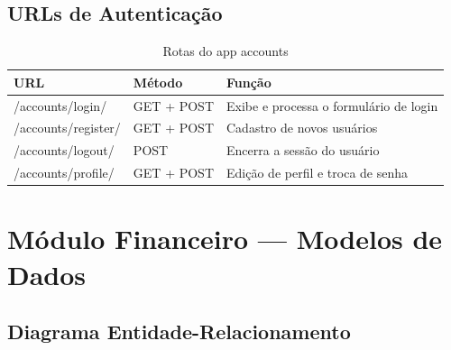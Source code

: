 \documentclass[12pt, a4paper, oneside]{report}
\begin{document}
\section{URLs de Autenticação}

\begin{table}[H]
\centering
\caption{Rotas do app accounts}
\begin{tabularx}{\textwidth}{>{\ttfamily}l l l}
\toprule
URL & Método & Função \\
\midrule
/accounts/login/ & GET + POST & Exibe e processa o formulário de login \\
/accounts/register/ & GET + POST & Cadastro de novos usuários \\
/accounts/logout/ & POST & Encerra a sessão do usuário \\
/accounts/profile/ & GET + POST & Edição de perfil e troca de senha \\
\bottomrule
\end{tabularx}
\end{table}

\chapter{Módulo Financeiro — Modelos de Dados}

\section{Diagrama Entidade-Relacionamento}
\end{document}
